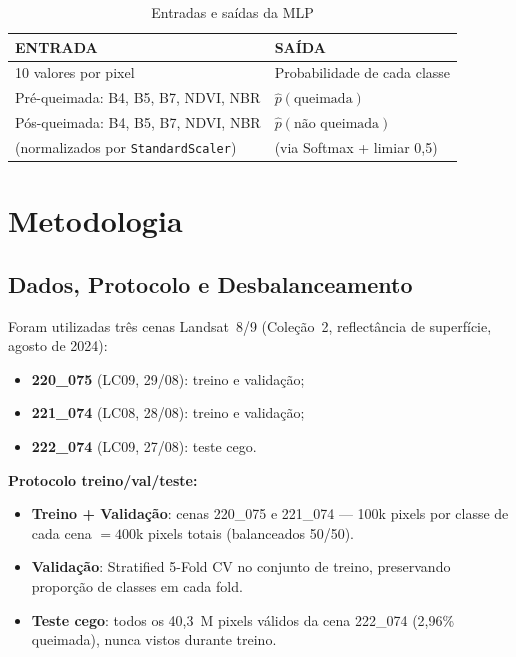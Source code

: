 \documentclass[conference]{IEEEtran}
\begin{document}
\begin{table}[!t]
  \caption{Entradas e saídas da MLP}
  \label{tab:io}
  \centering
  \begin{tabular}{ll}
    \toprule
    \textbf{ENTRADA} & \textbf{SAÍDA} \\
    \midrule
    10 valores por pixel & Probabilidade de cada classe \\
    Pré-queimada: B4, B5, B7, NDVI, NBR & $\hat{p}(\text{queimada})$ \\
    Pós-queimada: B4, B5, B7, NDVI, NBR & $\hat{p}(\text{não queimada})$ \\
    (normalizados por \texttt{StandardScaler}) & (via Softmax + limiar 0,5) \\
    \bottomrule
  \end{tabular}
\end{table}

\section{Metodologia}

\subsection{Dados, Protocolo e Desbalanceamento}

Foram utilizadas três cenas Landsat~8/9 (Coleção~2, reflectância de
superfície, agosto de 2024):
\begin{itemize}
  \item \textbf{220\_075} (LC09, 29/08): treino e validação;
  \item \textbf{221\_074} (LC08, 28/08): treino e validação;
  \item \textbf{222\_074} (LC09, 27/08): teste cego.
\end{itemize}

\textbf{Protocolo treino/val/teste:}
\begin{itemize}
  \item \textbf{Treino + Validação}: cenas 220\_075 e 221\_074 — 100k pixels
        por classe de cada cena $= 400$k pixels totais (balanceados 50/50).
  \item \textbf{Validação}: Stratified 5-Fold CV no conjunto de treino,
        preservando proporção de classes em cada fold.
  \item \textbf{Teste cego}: todos os 40,3~M pixels válidos da cena 222\_074
        (2,96\% queimada), nunca vistos durante treino.
\end{itemize}
\end{document}
